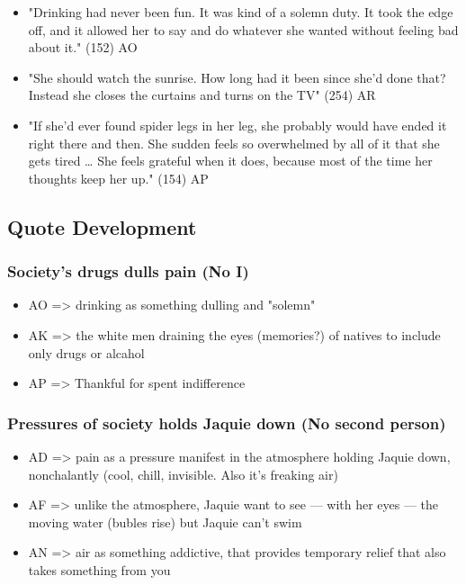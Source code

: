 \documentclass[letterpaper]{article}
\begin{document}
\begin{itemize}
\item "Drinking had never been fun. It was kind of a solemn duty. It took the edge off, and it allowed her to say and do whatever she wanted without feeling bad about it." (152) AO
\item "She should watch the sunrise. How long had it been since she'd done that? Instead she closes the curtains and turns on the TV" (254) AR
\item "If she'd ever found spider legs in her leg, she probably would have ended it right there and then. She sudden feels so overwhelmed by all of it that she gets tired \ldots{} She feels grateful when it does, because most of the time her thoughts keep her up." (154) AP
\end{itemize}

\subsection{Quote Development}
\label{sec:orga351eaf}

\subsubsection{Society's drugs dulls pain (No I)}
\label{sec:org65fdc62}
\begin{itemize}
\item AO => drinking as something dulling and "solemn"
\end{itemize}

\begin{itemize}
\item AK => the white men draining the eyes (memories?) of natives to include only drugs or alcahol
\item AP => Thankful for spent indifference
\end{itemize}

\subsubsection{Pressures of society holds Jaquie down (No second person)}
\label{sec:org61f8aca}
\begin{itemize}
\item AD => pain as a pressure manifest in the atmosphere holding Jaquie down, nonchalantly (cool, chill, invisible. Also it's freaking air)
\item AF => unlike the atmosphere, Jaquie want to see --- with her eyes --- the moving water (bubles rise) but Jaquie can't swim
\item AN => air as something addictive, that provides temporary relief that also takes something from you
\end{itemize}
\end{document}
